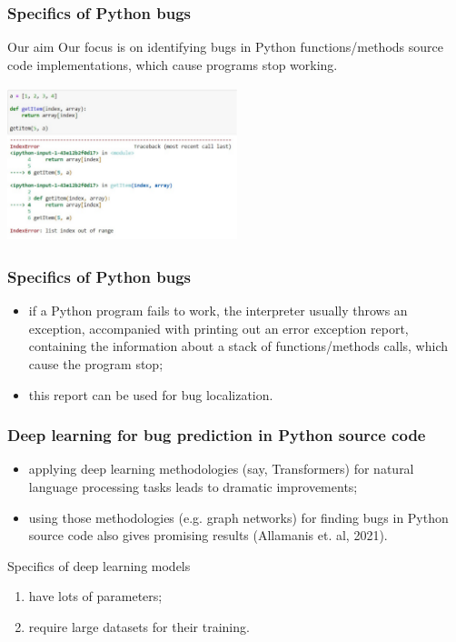 \documentclass{beamer}
\begin{document}
\begin{frame}
\frametitle{Specifics of Python bugs}

\begin{alertblock}{Our aim}
Our focus is on identifying bugs in Python functions/methods source code implementations,
which cause programs stop working.
\end{alertblock}


\begin{center}
\vspace{-0.2cm}
\includegraphics[height=4.5cm, width=6.7cm]{traceback.pdf}
\end{center}


\end{frame}


\begin{frame}
\frametitle{Specifics of Python bugs}

\begin{itemize}
\item if a Python program fails to work, the interpreter usually throws an exception, accompanied with printing out
an error exception report, containing the information about a stack of functions/methods calls,
which cause the program stop;
\item this report can be used for bug localization.
\end{itemize}

\end{frame}


\begin{frame}
\frametitle{Deep learning for bug prediction in Python source code}

\begin{itemize}
\item applying deep learning methodologies (say, Transformers) for natural language processing tasks leads to dramatic improvements;
\item using those methodologies (e.g. graph networks) for finding bugs in Python source code also gives promising results (Allamanis et. al, 2021).
\end{itemize}

\begin{block}{Specifics of deep learning models}
\begin{enumerate}
\item have lots of parameters;
\item require large datasets for their training.
\end{enumerate}
\end{block}

\end{frame}
\end{document}
